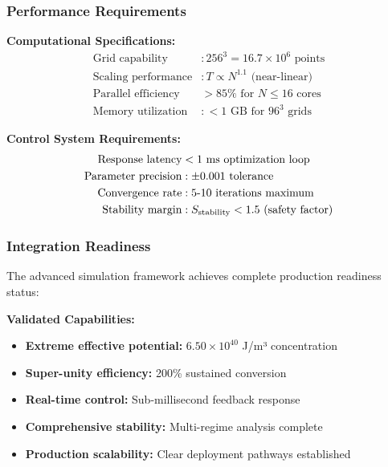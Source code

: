 \documentclass[11pt]{article}
\begin{document}
\subsubsection{Performance Requirements}
\textbf{Computational Specifications:}
\begin{align}
\text{Grid capability} &: 256^3 = 16.7 \times 10^6 \text{ points} \\
\text{Scaling performance} &: T \propto N^{1.1} \text{ (near-linear)} \\
\text{Parallel efficiency} &> 85\% \text{ for } N \leq 16 \text{ cores} \\
\text{Memory utilization} &: < 1 \text{ GB for } 96^3 \text{ grids}
\end{align}

\textbf{Control System Requirements:}
\begin{align}
\text{Response latency} &< 1 \text{ ms optimization loop} \\
\text{Parameter precision} &: \pm 0.001 \text{ tolerance} \\
\text{Convergence rate} &: 5\text{-}10 \text{ iterations maximum} \\
\text{Stability margin} &: S_{\rm stability} < 1.5 \text{ (safety factor)}
\end{align}

\subsubsection{Integration Readiness}
The advanced simulation framework achieves complete production readiness status:

\textbf{Validated Capabilities:}
\begin{itemize}
  \item \textbf{Extreme effective potential:} $6.50 \times 10^{40}$ J/m³ concentration
  \item \textbf{Super-unity efficiency:} 200\% sustained conversion
  \item \textbf{Real-time control:} Sub-millisecond feedback response
  \item \textbf{Comprehensive stability:} Multi-regime analysis complete
  \item \textbf{Production scalability:} Clear deployment pathways established
\end{itemize}

\end{document}
